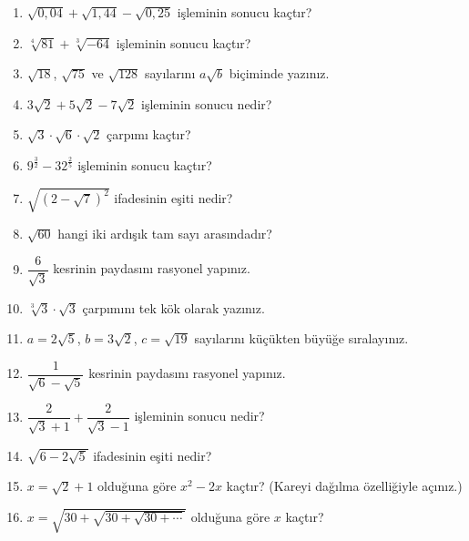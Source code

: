 \begin{enumerate}[label=\textbf{\arabic*.},leftmargin=*,itemsep=6pt]
\item \(\sqrt{0{,}04}+\sqrt{1{,}44}-\sqrt{0{,}25}\) işleminin sonucu kaçtır?
\item \(\sqrt[4]{81}+\sqrt[3]{-64}\) işleminin sonucu kaçtır?
\item \(\sqrt{18}\), \(\sqrt{75}\) ve \(\sqrt{128}\) sayılarını \(a\sqrt b\) biçiminde yazınız.
\item \(3\sqrt2+5\sqrt2-7\sqrt2\) işleminin sonucu nedir?
\item \(\sqrt3\cdot\sqrt6\cdot\sqrt2\) çarpımı kaçtır?
\item \(9^{\frac32}-32^{\frac25}\) işleminin sonucu kaçtır?
\item \(\sqrt{(2-\sqrt7)^2}\) ifadesinin eşiti nedir?
\item \(\sqrt{60}\) hangi iki ardışık tam sayı arasındadır?
\item \(\dfrac{6}{\sqrt3}\) kesrinin paydasını rasyonel yapınız.
\item \(\sqrt[3]{3}\cdot\sqrt3\) çarpımını tek kök olarak yazınız.
\item \(a=2\sqrt5\), \(b=3\sqrt2\), \(c=\sqrt{19}\) sayılarını küçükten büyüğe sıralayınız.
\item \(\dfrac{1}{\sqrt6-\sqrt5}\) kesrinin paydasını rasyonel yapınız.
\item \(\dfrac{2}{\sqrt3+1}+\dfrac{2}{\sqrt3-1}\) işleminin sonucu nedir?
\item \(\sqrt{6-2\sqrt5}\) ifadesinin eşiti nedir?
\item \(x=\sqrt2+1\) olduğuna göre \(x^2-2x\) kaçtır? (Kareyi dağılma özelliğiyle açınız.)
\item \(x=\sqrt{30+\sqrt{30+\sqrt{30+\cdots}}}\) olduğuna göre \(x\) kaçtır?
\end{enumerate}

